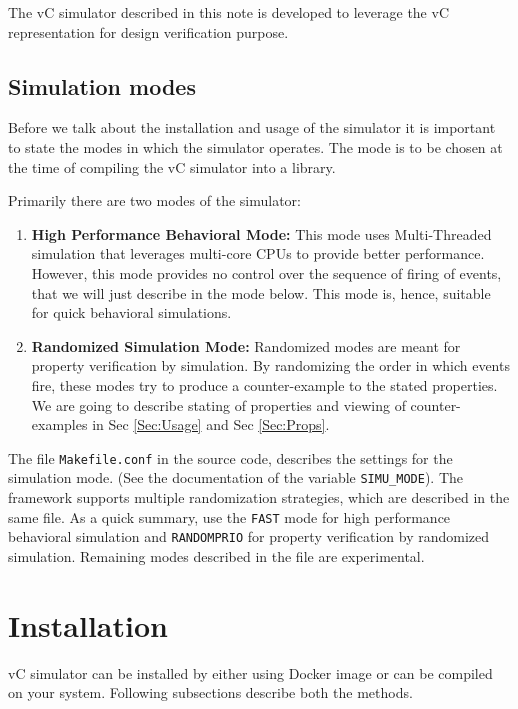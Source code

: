 \documentclass[12pt,a4paper]{article}
\begin{document}
The vC simulator described in this note is developed to leverage the vC representation for design verification purpose.


\subsection{Simulation modes}

Before we talk about the installation and usage of the simulator it is important to state the modes in which the simulator operates. The mode is to be chosen at the time of compiling the vC simulator into a library.

Primarily there are two modes of the simulator:

\begin{enumerate}
\item \textbf{High Performance Behavioral Mode:} This mode uses Multi-Threaded simulation that leverages multi-core CPUs to provide better performance. However, this mode provides no control over the sequence of firing of events, that we will just describe in the mode below. This mode is, hence, suitable for quick behavioral simulations.

\item \textbf{Randomized Simulation Mode:} Randomized modes are meant for property verification by simulation. By randomizing the order in which events fire, these modes try to produce a counter-example to the stated properties. We are going to describe stating of properties and viewing of counter-examples in Sec \ref{Sec:Usage} and Sec \ref{Sec:Props}.

\end{enumerate}

The file \texttt{Makefile.conf} in the source code, describes the settings for the simulation mode. (See the documentation of the variable \texttt{SIMU_MODE}). The framework supports multiple randomization strategies, which are described in the same file. As a quick summary, use the \texttt{FAST} mode for high performance behavioral simulation and \texttt{RANDOMPRIO} for property verification by randomized simulation. Remaining modes described in the file are experimental.

\clearpage
\section{Installation}

vC simulator can be installed by either using Docker image or can be compiled on your system. Following subsections describe both the methods.
\end{document}
